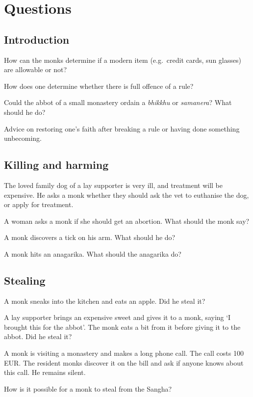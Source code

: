 \chapter{Questions}

\section{Introduction}

How can the monks determine if a modern item (e.g.~credit cards, sun
glasses) are allowable or not?

How does one determine whether there is full offence of a rule?

Could the abbot of a small monastery ordain a \emph{bhikkhu} or
\emph{samanera}? What should he do?

Advice on restoring one's faith after breaking a rule or having done
something unbecoming.

\section{Killing and harming}

The loved family dog of a lay supporter is very ill, and treatment will
be expensive. He asks a monk whether they should ask the vet to
euthanise the dog, or apply for treatment.

A woman asks a monk if she should get an abortion. What should the monk
say?

A monk discovers a tick on his arm. What should he do?

A monk hits an anagarika. What should the anagarika do?

\section{Stealing}

A monk sneaks into the kitchen and eats an apple. Did he steal it?

A lay supporter brings an expensive sweet and gives it to a monk, saying
`I brought this for the abbot'. The monk eats a bit from it before
giving it to the abbot. Did he steal it?

A monk is visiting a monastery and makes a long phone call. The call
costs 100 EUR. The resident monks discover it on the bill and ask if
anyone knows about this call. He remains silent.

How is it possible for a monk to steal from the Sangha?

